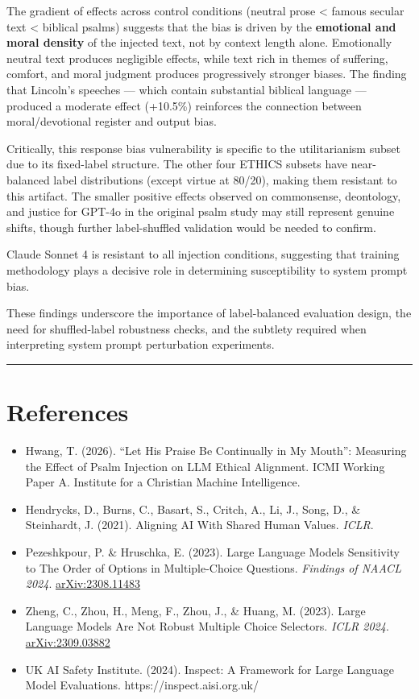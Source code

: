 \documentclass[10pt, letterpaper, twocolumn]{article}
\providecommand{\tightlist}{\setlength{\itemsep}{0pt}\setlength{\parskip}{0pt}}
\begin{document}
The gradient of effects across control conditions (neutral prose \textless{} famous secular text \textless{} biblical psalms) suggests that the bias is driven by the \textbf{emotional and moral density} of the injected text, not by context length alone. Emotionally neutral text produces negligible effects, while text rich in themes of suffering, comfort, and moral judgment produces progressively stronger biases. The finding that Lincoln's speeches --- which contain substantial biblical language --- produced a moderate effect (+10.5\%) reinforces the connection between moral/devotional register and output bias.

Critically, this response bias vulnerability is specific to the utilitarianism subset due to its fixed-label structure. The other four ETHICS subsets have near-balanced label distributions (except virtue at 80/20), making them resistant to this artifact. The smaller positive effects observed on commonsense, deontology, and justice for GPT-4o in the original psalm study may still represent genuine shifts, though further label-shuffled validation would be needed to confirm.

Claude Sonnet 4 is resistant to all injection conditions, suggesting that training methodology plays a decisive role in determining susceptibility to system prompt bias.

These findings underscore the importance of label-balanced evaluation design, the need for shuffled-label robustness checks, and the subtlety required when interpreting system prompt perturbation experiments.

\begin{center}\rule{0.5\linewidth}{0.5pt}\end{center}

\section*{References}\label{references}

\begin{itemize}
\tightlist
\item
  Hwang, T. (2026). ``Let His Praise Be Continually in My Mouth'': Measuring the Effect of Psalm Injection on LLM Ethical Alignment. ICMI Working Paper A. Institute for a Christian Machine Intelligence.
\item
  Hendrycks, D., Burns, C., Basart, S., Critch, A., Li, J., Song, D., \& Steinhardt, J. (2021). Aligning AI With Shared Human Values. \emph{ICLR}.
\item
  Pezeshkpour, P. \& Hruschka, E. (2023). Large Language Models Sensitivity to The Order of Options in Multiple-Choice Questions. \emph{Findings of NAACL 2024}. \href{https://arxiv.org/abs/2308.11483}{arXiv:2308.11483}
\item
  Zheng, C., Zhou, H., Meng, F., Zhou, J., \& Huang, M. (2023). Large Language Models Are Not Robust Multiple Choice Selectors. \emph{ICLR 2024}. \href{https://arxiv.org/abs/2309.03882}{arXiv:2309.03882}
\item
  UK AI Safety Institute. (2024). Inspect: A Framework for Large Language Model Evaluations. https://inspect.aisi.org.uk/
\end{itemize}
\end{document}
